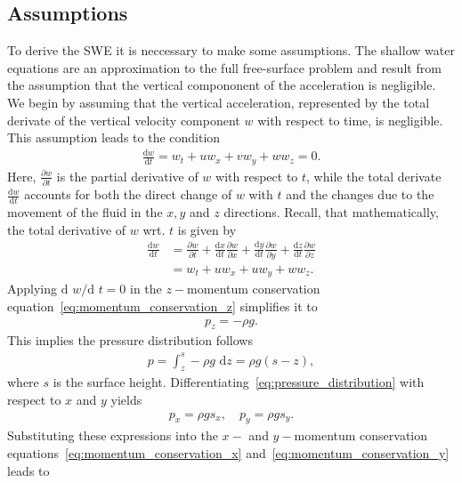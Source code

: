 \subsection{Assumptions}
To derive the SWE it is neccessary to make some assumptions. 
The shallow water equations are an approximation to the full free-surface problem and result from the assumption that the vertical compononent of the acceleration is negligible.
We begin by assuming that the vertical acceleration, represented by the total derivate of the vertical velocity component $w$ with respect to time, is negligible.
This assumption leads to the condition
\begin{align*}%
    \frac{\text{d} w}{\text{d} t} = w_t + uw_x + vw_y + ww_z = 0.
\end{align*}
Here, $\frac{\partial w}{\partial t}$ is the partial derivative of $w$ with respect to $t$, while the total derivate $\frac{\text{d} w}{\text{d} t}$ accounts for both the direct change of $w$ with $t$ and the changes due to the movement of the fluid in the $x, y$ and $z$ directions.
Recall, that mathematically, the total derivative of $w$ wrt. $t$ is given by
\begin{align*}
    \frac{\text{d} w}{\text{d} t} &= \frac{\partial w}{\partial t} + \frac{\text{d} x}{\text{d} t} \frac{\partial w}{\partial x} + \frac{\text{d} y}{\text{d} t}  \frac{\partial w}{\partial y} + \frac{\text{d} z}{\text{d} t}  \frac{\partial w}{\partial z} \\
    &= w_t + u w_x + u w_y + w w_z .
\end{align*}
Applying $\text{d }w/\text{d }t = 0$ in the $z-$momentum conservation equation~\eqref{eq:momentum_conservation_z} simplifies it to
\begin{align*}
    p_z = -\rho g.
\end{align*}
This implies the pressure distribution follows
\begin{align}\label{eq:pressure_distribution}
    p = \int_z^s - \rho g \text{ d} z = \rho g (s - z),
\end{align}
where $s$ is the surface height.
Differentiating~\eqref{eq:pressure_distribution} with respect to $x$ and $y$ yields
\begin{align*}%
    p_x = \rho g s_x, \quad p_y = \rho g s_y.
\end{align*}
Substituting these expressions into the $x-$ and $y-$momentum conservation equations~\eqref{eq:momentum_conservation_x} and~\eqref{eq:momentum_conservation_y} leads to 
